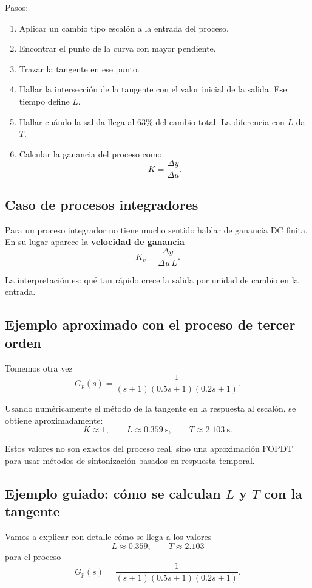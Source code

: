 \documentclass[11pt]{article}
\begin{document}
Pasos:
\begin{enumerate}[label=\arabic*.]
\item Aplicar un cambio tipo escal\'on a la entrada del proceso.
\item Encontrar el punto de la curva con mayor pendiente.
\item Trazar la tangente en ese punto.
\item Hallar la intersecci\'on de la tangente con el valor inicial de la salida. Ese tiempo define $L$.
\item Hallar cu\'ando la salida llega al $63\%$ del cambio total. La diferencia con $L$ da $T$.
\item Calcular la ganancia del proceso como
\begin{equation}
K=\frac{\Delta y}{\Delta u}.
\end{equation}
\end{enumerate}

\subsection{Caso de procesos integradores}
Para un proceso integrador no tiene mucho sentido hablar de ganancia DC finita. En su lugar aparece la \textbf{velocidad de ganancia}
\begin{equation}
K_v=\frac{\Delta y}{\Delta u\,L}.
\end{equation}

La interpretaci\'on es: qu\'e tan r\'apido crece la salida por unidad de cambio en la entrada.

\subsection{Ejemplo aproximado con el proceso de tercer orden}
Tomemos otra vez
\[
G_p(s)=\frac{1}{(s+1)(0.5s+1)(0.2s+1)}.
\]

Usando num\'ericamente el m\'etodo de la tangente en la respuesta al escal\'on, se obtiene aproximadamente:
\begin{equation}
K\approx 1,\qquad L\approx 0.359~\text{s},\qquad T\approx 2.103~\text{s}.
\end{equation}

Estos valores no son exactos del proceso real, sino una aproximaci\'on FOPDT para usar m\'etodos de sintonizaci\'on basados en respuesta temporal.

\subsection{Ejemplo guiado: c\'omo se calculan $L$ y $T$ con la tangente}
Vamos a explicar con detalle c\'omo se llega a los valores
\[
L\approx 0.359,\qquad T\approx 2.103
\]
para el proceso
\[
G_p(s)=\frac{1}{(s+1)(0.5s+1)(0.2s+1)}.
\]
\end{document}
